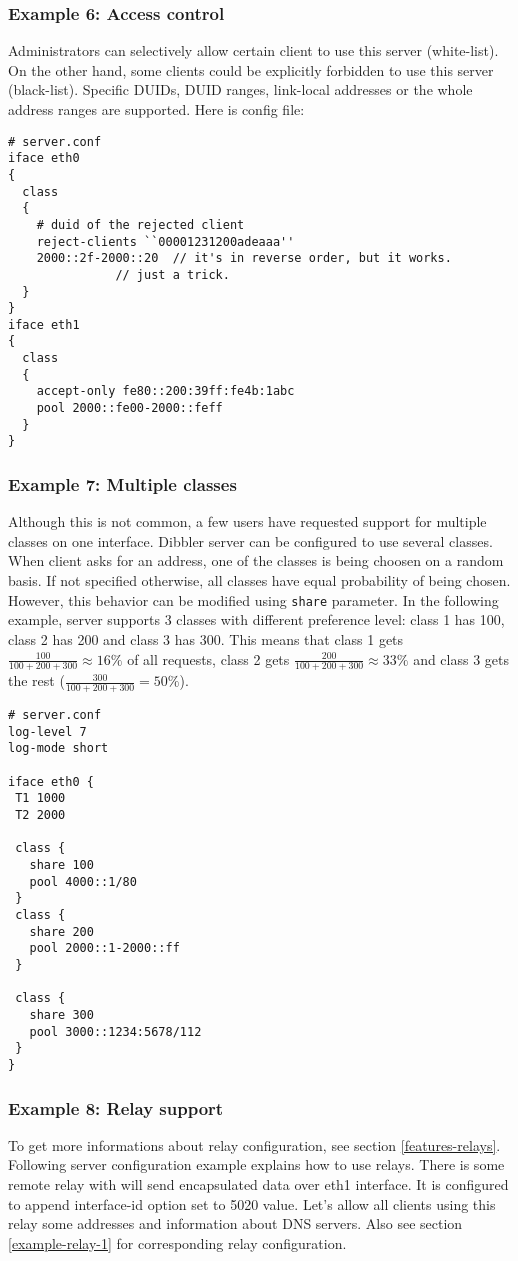 \subsubsection{Example 6: Access control}
Administrators can selectively allow certain client to use this
server (white-list). On the other hand, some clients could be
explicitly forbidden to use this server (black-list). Specific DUIDs,
DUID ranges, link-local addresses or the whole address ranges are
supported. Here is config file:

\begin{lstlisting}
# server.conf
iface eth0
{
  class
  {
    # duid of the rejected client
    reject-clients ``00001231200adeaaa''
    2000::2f-2000::20  // it's in reverse order, but it works.
		       // just a trick.
  }
}
iface eth1
{
  class
  {
    accept-only fe80::200:39ff:fe4b:1abc
    pool 2000::fe00-2000::feff
  }
}
\end{lstlisting}

\subsubsection{Example 7: Multiple classes}
Although this is not common, a few users have requested support for multiple classes on one interface.
Dibbler server can be configured to use several classes. When client asks for an address, one of the classes
is being choosen on a random basis. If not specified otherwise, all classes have equal probability of being chosen.
However, this behavior can be modified using \verb+share+ parameter. In the following example, server supports
3 classes with different preference level: class 1 has 100, class 2 has 200 and class 3 has 300. This means that class 1
gets $\frac{100}{100+200+300} \approx 16\% $ of all requests, class 2
gets $\frac{200}{100+200+300} \approx 33\% $ and class 3 gets the rest
($\frac{300}{100+200+300}=50\% $).

\begin{lstlisting}
# server.conf
log-level 7
log-mode short

iface eth0 {
 T1 1000
 T2 2000

 class {
   share 100
   pool 4000::1/80
 }
 class {
   share 200
   pool 2000::1-2000::ff
 }

 class {
   share 300
   pool 3000::1234:5678/112
 }
}
\end{lstlisting}

\subsubsection{Example 8: Relay support}
\label{example-server-relay1}
To get more informations about relay configuration, see section \ref{features-relays}.
Following server configuration example explains how to use
relays. There is some remote relay with will send encapsulated data over
eth1 interface. It is configured to append interface-id option set to
5020 value. Let's allow all clients using this relay some addresses
and information about DNS servers. Also see section
\ref{example-relay-1} for corresponding relay configuration.

